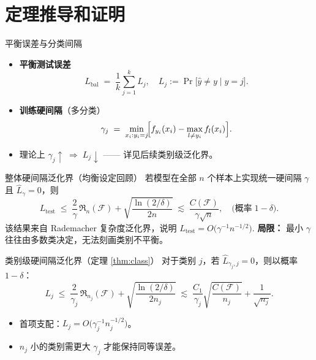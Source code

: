 \documentclass{beamer}
\begin{document}
\section{定理推导和证明}

\begin{frame}{平衡误差与分类间隔}
    \begin{itemize}
        \item \textbf{平衡测试误差}  
              \[
                  L_{\text{bal}}\;=\;\frac{1}{k}\sum_{j=1}^{k} L_j,
                  \quad
                  L_j:=\Pr\!\bigl[\hat y\neq y\mid y=j\bigr].
              \]
        \item \textbf{训练硬间隔}（多分类）  
              \[
                  \gamma_j
                  \;=\;
                  \min_{x_i:y_i=j}\!\Bigl[
                     f_{y_i}(x_i)-\max_{l\neq y_i}f_l(x_i)
                  \Bigr].
              \]
        \item 理论上 $\gamma_j\!\uparrow\;\Rightarrow\;L_j\!\downarrow$  
              —— 详见后续类别级泛化界。
    \end{itemize}
\end{frame}

\begin{frame}{整体硬间隔泛化界（均衡设定回顾）}
    若模型在全部 $n$ 个样本上实现统一硬间隔 $\gamma$ 且 $\widehat L_{\gamma}=0$，则
    \[
        L_{\text{test}}
        \;\le\;
        \frac{2}{\gamma}\,\mathfrak{R}_{n}(\mathcal{F})
        +\sqrt{\frac{\ln(2/\delta)}{2n}}
        \;\lesssim\;
        \frac{C(\mathcal F)}{\gamma\sqrt n},
        \quad
        \text{(概率} \;1-\delta\text{)}.
    \]
    该结果来自 Rademacher 复杂度泛化界，说明
    \(
        L_{\text{test}}
        =O\!\bigl(\gamma^{-1}n^{-1/2}\bigr).
    \)
    \vskip2mm
    \textbf{局限：} 最小 $\gamma$ 往往由多数类决定，无法刻画类别不平衡。
\end{frame}

\begin{frame}{类别级硬间隔泛化界（定理 \ref{thm:class}）}
    对于类别 $j$，若 $\widehat L_{\gamma_j,j}=0$，则以概率 $1-\delta$：
    \[
        L_j
        \;\le\;
        \frac{2}{\gamma_j}\,\mathfrak{R}_{n_j}(\mathcal F)
        +\sqrt{\frac{\ln(2/\delta)}{2n_j}}
        \;\lesssim\;
        \frac{C_1}{\gamma_j}\sqrt{\frac{C(\mathcal F)}{n_j}}
        +\frac{1}{\sqrt{n_j}}.
    \]
    \begin{itemize}
        \item 首项支配：$\displaystyle L_j=O\!\bigl(\gamma_j^{-1}n_j^{-1/2}\bigr)$。
        \item $n_j$ 小的类别需更大 $\gamma_j$ 才能保持同等误差。
    \end{itemize}
\end{frame}
\end{document}
